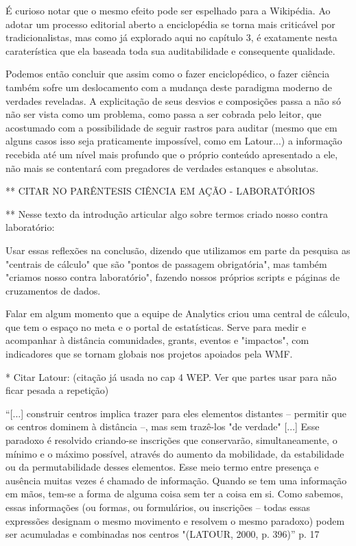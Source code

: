 É curioso notar que o mesmo efeito pode ser espelhado para a Wikipédia. Ao adotar um processo editorial aberto a enciclopédia se torna mais criticável por tradicionalistas, mas como já explorado aqui no capítulo 3, é exatamente nesta caraterística que ela baseada toda sua auditabilidade e consequente qualidade.

Podemos então concluir que assim como o fazer enciclopédico, o fazer ciência também sofre um deslocamento com a mudança deste paradigma moderno de verdades reveladas. A explicitação de seus desvios e composições passa a não só não ser vista como um problema, como passa a ser cobrada pelo leitor, que acostumado com a possibilidade de seguir rastros para auditar (mesmo que em alguns casos isso seja praticamente impossível, como em Latour...) a informação recebida até um nível mais profundo que o próprio conteúdo apresentado a ele, não mais se contentará com pregadores de verdades estanques e absolutas.

** CITAR NO PARÊNTESIS CIÊNCIA EM AÇÃO - LABORATÓRIOS

** Nesse texto da introdução articular algo sobre termos criado nosso contra laboratório:

Usar essas reflexões na conclusão, dizendo que utilizamos em parte da pesquisa as "centrais de cálculo" que são "pontos de passagem obrigatória", mas também "criamos nosso contra laboratório", fazendo nossos próprios scripts e páginas de cruzamentos de dados.

Falar em algum momento que a equipe de Analytics criou uma central de cálculo, que tem o espaço no meta e o portal de estatísticas. Serve para medir e acompanhar à distância comunidades, grants, eventos e "impactos", com indicadores que se tornam globais nos projetos apoiados pela WMF.

* Citar Latour: (citação já usada no cap 4 WEP. Ver que partes usar para não ficar pesada a repetição)

``[...] construir centros implica trazer para eles elementos distantes – permitir que os centros dominem à distância –, mas sem trazê-los "de verdade" [...] Esse paradoxo é resolvido criando-se inscrições que conservarão, simultaneamente, o mínimo e o máximo possível, através do aumento da mobilidade, da estabilidade ou da permutabilidade desses elementos. Esse meio termo entre presença e ausência muitas vezes é chamado de informação. Quando se tem uma informação em mãos, tem-se a forma de alguma coisa sem ter a coisa em si. Como sabemos, essas informações (ou formas, ou formulários, ou inscrições – todas essas expressões designam o mesmo movimento e resolvem o mesmo paradoxo) podem ser acumuladas e combinadas nos centros "(LATOUR, 2000, p. 396)'' p. 17


